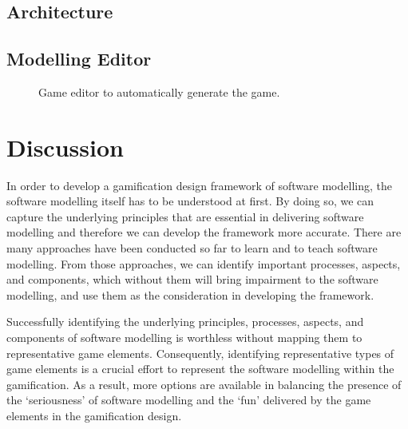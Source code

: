 \documentclass[runningheads,a4paper]{llncs}
\begin{document}
\subsection{Architecture}

\subsection{Modelling Editor}

\begin{figure}[htb]
\centering
{}
\caption{Game editor to automatically generate the game.}
\end{figure}

\section{Discussion}
In order to develop a gamification design framework of software modelling, the software modelling itself has to be understood at first. By doing so, we can capture the underlying principles that are essential in delivering software modelling and therefore we can develop the framework more accurate. There are many approaches have been conducted so far to learn and to teach software modelling. From those approaches, we can identify important processes, aspects, and components, which without them will bring impairment to the software modelling, and use them as the consideration in developing the framework. 

Successfully identifying the underlying principles, processes, aspects, and components of software modelling is worthless without mapping them to representative game elements. Consequently, identifying representative types of game elements is a crucial effort to represent the software modelling within the gamification. As a result, more options are available in balancing the presence of the ‘seriousness’ of software modelling and the ‘fun’ delivered by the game elements in the gamification design.
\end{document}
